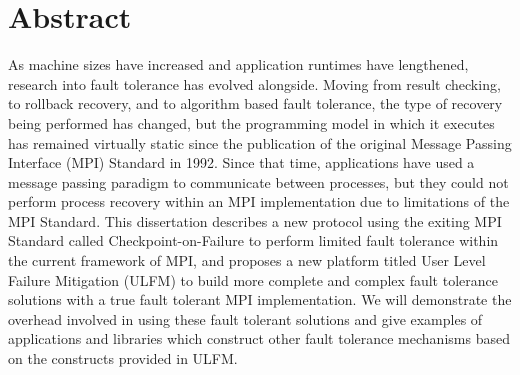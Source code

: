 \chapter*{Abstract}
\label{chap:abstract}

As machine sizes have increased and application runtimes have lengthened, 
research into fault tolerance has evolved alongside. Moving from result checking, 
to rollback recovery, and to algorithm based fault tolerance, the type of recovery 
being performed has changed, but the programming model in which it executes has remained 
virtually static since the publication of the original Message Passing Interface 
(MPI) Standard in 1992. Since that time, applications have used a message passing 
paradigm to communicate between processes, but they could not perform process 
recovery within an MPI implementation due to limitations of the MPI Standard. 
This dissertation describes a new protocol using the exiting MPI Standard called 
Checkpoint-on-Failure to perform limited fault tolerance within the current framework of MPI, 
and proposes a new platform titled User Level Failure Mitigation (ULFM) to build 
more complete and complex fault tolerance solutions with a true fault tolerant 
MPI implementation. We will demonstrate the overhead involved in using these 
fault tolerant solutions and give examples of applications and libraries which 
construct other fault tolerance mechanisms based on the constructs provided in 
ULFM.